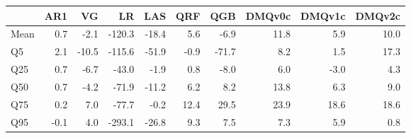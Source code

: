 \begin{tabular}{lrrrrrrrrr}
\toprule
 & AR1 & VG & LR & LAS & QRF & QGB & DMQv0c & DMQv1c & DMQv2c \\
\midrule
Mean & 0.7 & -2.1 & -120.3 & -18.4 & 5.6 & -6.9 & 11.8 & 5.9 & 10.0 \\
Q5 & 2.1 & -10.5 & -115.6 & -51.9 & -0.9 & -71.7 & 8.2 & 1.5 & 17.3 \\
Q25 & 0.7 & -6.7 & -43.0 & -1.9 & 0.8 & -8.0 & 6.0 & -3.0 & 4.3 \\
Q50 & 0.7 & -4.2 & -71.9 & -11.2 & 6.2 & 8.2 & 13.8 & 6.3 & 9.0 \\
Q75 & 0.2 & 7.0 & -77.7 & -0.2 & 12.4 & 29.5 & 23.9 & 18.6 & 18.6 \\
Q95 & -0.1 & 4.0 & -293.1 & -26.8 & 9.3 & 7.5 & 7.3 & 5.9 & 0.8 \\
\bottomrule
\end{tabular}
